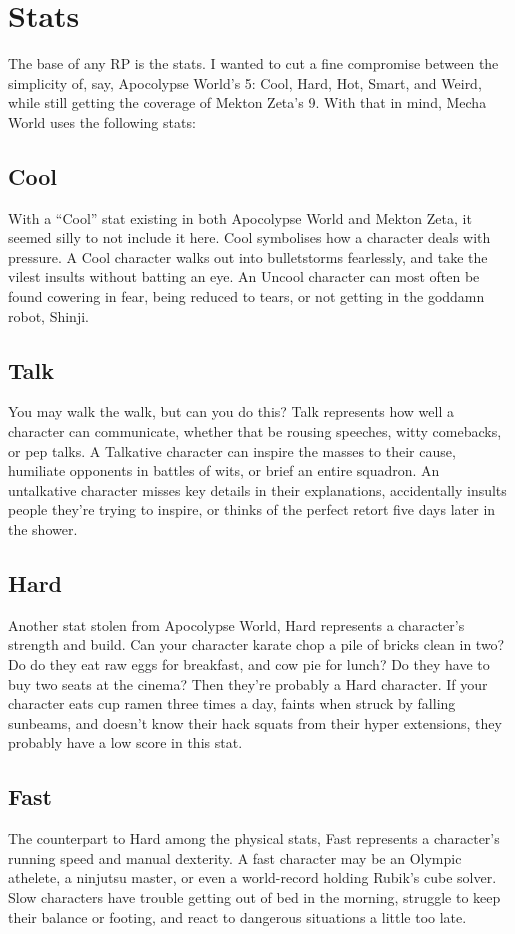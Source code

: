 \section{Stats}
The base of any RP is the stats. I wanted to cut a fine compromise between the simplicity of, say, Apocolypse World's 5: Cool, Hard, Hot, Smart, and Weird, while still getting the coverage of Mekton Zeta's 9. With that in mind, Mecha World uses the following stats:

\subsection{Cool}
With a ``Cool'' stat existing in both Apocolypse World and Mekton Zeta, it seemed silly to not include it here. Cool symbolises how a character deals with pressure. A Cool character walks out into bulletstorms fearlessly, and take the vilest insults without batting an eye. An Uncool character can most often be found cowering in fear, being reduced to tears, or not getting in the goddamn robot, Shinji.
 
\subsection{Talk}
You may walk the walk, but can you do this? Talk represents how well a character can communicate, whether that be rousing speeches, witty comebacks, or pep talks. A Talkative character can inspire the masses to their cause, humiliate opponents in battles of wits, or brief an entire squadron. An untalkative character misses key details in their explanations, accidentally insults people they're trying to inspire, or thinks of the perfect retort five days later in the shower.

\subsection{Hard}
Another stat stolen from Apocolypse World, Hard represents a character's strength and build. Can your character karate chop a pile of bricks clean in two? Do do they eat raw eggs for breakfast, and cow pie for lunch? Do they have to buy two seats at the cinema? Then they're probably a Hard character. If your character eats cup ramen three times a day, faints when struck by falling sunbeams, and doesn't know their hack squats from their hyper extensions, they probably have a low score in this stat.

\subsection{Fast}
The counterpart to Hard among the physical stats, Fast represents a character's running speed and manual dexterity. A fast character may be an Olympic athelete, a ninjutsu master, or even a world-record holding Rubik's cube solver. Slow characters have trouble getting out of bed in the morning, struggle to keep their balance or footing, and react to dangerous situations a little too late.

